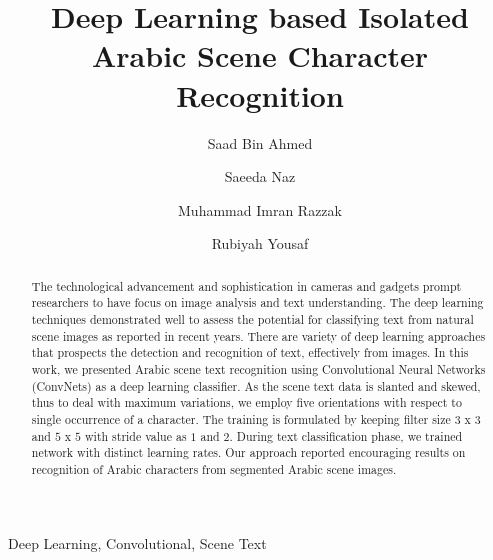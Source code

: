 \documentclass[conference]{IEEEtran}
\begin{document}
\pagestyle{fancy}
\title{Deep Learning based Isolated Arabic Scene Character Recognition}


\author[1,3]{Saad Bin Ahmed}
\author[2]{Saeeda Naz}
\author[1]{Muhammad Imran Razzak}
\author[3]{Rubiyah Yousaf}











\maketitle


\begin{abstract}

The technological advancement and sophistication in cameras and gadgets prompt researchers to have focus on image analysis and text understanding. The deep learning techniques demonstrated well to assess the potential for classifying text from natural scene images as reported in recent years. There are variety of deep learning approaches that prospects the detection and recognition of text, effectively from images. In this work, we presented Arabic scene text recognition using Convolutional Neural Networks (ConvNets) as a deep learning classifier. As the scene text data is slanted and skewed, thus to deal with maximum variations, we employ five orientations with respect to single occurrence of a character.
The training is formulated by keeping filter size $3$ x $3$ and $5$ x $5$ with stride value as $1$ and $2$.
During text classification phase, we trained network with distinct learning rates.
Our approach reported encouraging results on recognition of Arabic characters from segmented Arabic scene images.


\end{abstract}

\begin{IEEEkeywords}
Deep Learning, Convolutional, Scene Text
\end{IEEEkeywords}
\end{document}
